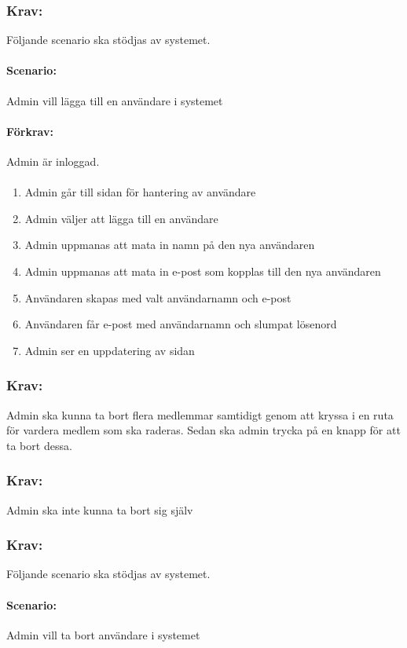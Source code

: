 \documentclass[paper=a4, fontsize=11pt,twoside]{article}
\begin{document}
\subsubsection*{Krav:} Följande scenario ska stödjas av systemet. 
\paragraph{Scenario:}
Admin vill lägga till en användare i systemet
\paragraph{Förkrav:}
Admin är inloggad. 
\paragraph{}
\begin{enumerate}
\item Admin går till sidan för hantering av användare
\item Admin väljer att lägga till en användare
\item Admin uppmanas att mata in namn på den nya användaren
\item Admin uppmanas att mata in e-post som kopplas till den nya användaren
\item Användaren skapas med valt användarnamn och e-post
\item Användaren får e-post med användarnamn och slumpat lösenord
\item Admin ser en uppdatering av sidan
\end{enumerate}

\subsubsection*{Krav:} Admin ska kunna ta bort flera medlemmar samtidigt genom att kryssa i en ruta för vardera medlem som ska raderas. Sedan ska admin trycka på en knapp för att ta bort dessa.
\subsubsection*{Krav:} Admin ska inte kunna ta bort sig själv

\subsubsection*{Krav:} Följande scenario ska stödjas av systemet. 
\paragraph{Scenario:}
Admin vill ta bort användare i systemet
\end{document}
